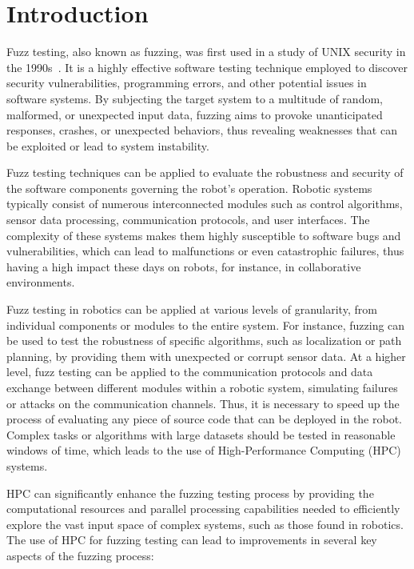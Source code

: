 \documentclass{svproc}
\begin{document}
\section{Introduction}


Fuzz testing, also known as fuzzing, was first used in a study of UNIX security in the 1990s~\cite{inicio_fuzzing,continuacion_fuzzing}. It is a highly effective software testing technique employed to discover security vulnerabilities, programming errors, and other potential issues in software systems. By subjecting the target system to a multitude of random, malformed, or unexpected input data, fuzzing aims to provoke unanticipated responses, crashes, or unexpected behaviors, thus revealing weaknesses that can be exploited or lead to system instability. 

Fuzz testing techniques can be applied to evaluate the robustness and security of the software components governing the robot's operation\cite{rvfuzzer}. Robotic systems typically consist of numerous interconnected modules such as control algorithms, sensor data processing, communication protocols, and user interfaces. The complexity of these systems makes them highly susceptible to software bugs and vulnerabilities, which can lead to malfunctions or even catastrophic failures, thus having a high impact these days on robots, for instance, in collaborative environments.

Fuzz testing in robotics can be applied at various levels of granularity, from individual components or modules to the entire system. For instance, fuzzing can be used to test the robustness of specific algorithms, such as localization or path planning, by providing them with unexpected or corrupt sensor data. At a higher level, fuzz testing can be applied to the communication protocols and data exchange between different modules within a robotic system, simulating failures or attacks on the communication channels.
Thus, it is necessary to speed up the process of evaluating any piece of source code that can be deployed in the robot.
Complex tasks or algorithms with large datasets should be tested in reasonable windows of time, which leads to the use of High-Performance Computing (HPC) systems.


HPC can significantly enhance the fuzzing testing process by providing the computational resources and parallel processing capabilities needed to efficiently explore the vast input space of complex systems, such as those found in robotics. The use of HPC for fuzzing testing can lead to improvements in several key aspects of the fuzzing process:
\end{document}
